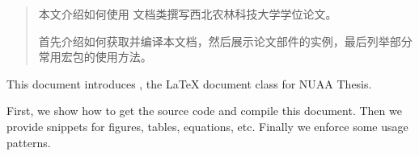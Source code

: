 
\begin{abstract}
本文介绍如何使用\nwafuthesis{} 文档类撰写西北农林科技大学学位论文。

首先介绍如何获取并编译本文档，然后展示论文部件的实例，最后列举部分常用宏包的使用方法。
\end{abstract}

\begin{abstractEn}
This document introduces \nwafuthesis, the \LaTeX{} document class for NUAA Thesis.

First, we show how to get the source code and compile this document.
Then we provide snippets for figures, tables, equations, etc.
Finally we enforce some usage patterns.
\end{abstractEn}

